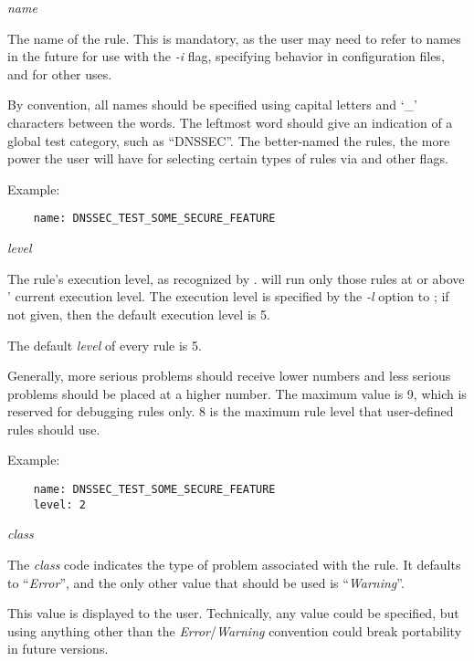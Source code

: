 \begin{description}

\item {\it name}\verb" "

The name of the rule.  This is mandatory, as the user may need to
refer to names in the future for use with the {\it -i} flag,
specifying behavior in configuration files, and for other uses.

By convention, all names should be specified using capital letters and
`\_' characters between the words.  The leftmost word should give an
indication of a global test category, such as ``DNSSEC''.  The
better-named the rules, the more power the user will have for
selecting certain types of rules via  and other flags.

Example:

\begin{verbatim}
    name: DNSSEC_TEST_SOME_SECURE_FEATURE
\end{verbatim}

\item {\it level}\verb" "

The rule's execution level, as recognized by .   will
run only those rules at or above ' current execution level.
The execution level is specified by the {\it -l} option to
; if not given, then the default execution level is 5.

The default {\it level} of every rule is 5.

Generally, more serious problems should receive lower numbers and
less serious problems should be placed at a higher number.  The
maximum value is 9, which is reserved for debugging rules only.
8 is the maximum rule level that user-defined rules should use.

Example:

\begin{verbatim}
    name: DNSSEC_TEST_SOME_SECURE_FEATURE
    level: 2
\end{verbatim}

\item {\it class}\verb" "

The {\it class} code indicates the type of problem associated with the
rule.  It defaults to ``{\it Error}'', and the only other value that should
be used is ``{\it Warning}''.

This value is displayed to the user.  Technically, any value could be
specified, but using anything other than the {\it Error}/{\it Warning}
convention could break portability in future versions.


\end{description}
